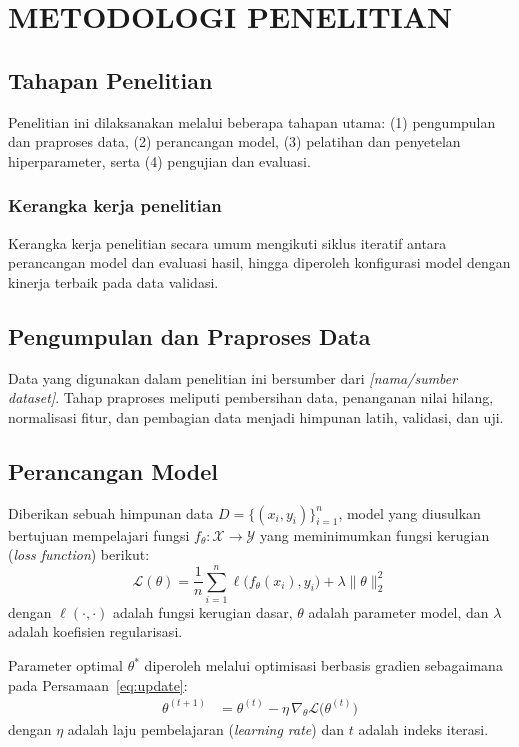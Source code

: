 \chapter{METODOLOGI PENELITIAN}

\section{Tahapan Penelitian}
Penelitian ini dilaksanakan melalui beberapa tahapan utama: (1) pengumpulan dan praproses data, (2) perancangan model, (3) pelatihan dan penyetelan hiperparameter, serta (4) pengujian dan evaluasi.

\subsection{Kerangka kerja penelitian}
Kerangka kerja penelitian secara umum mengikuti siklus iteratif antara perancangan model dan evaluasi hasil, hingga diperoleh konfigurasi model dengan kinerja terbaik pada data validasi.

\section{Pengumpulan dan Praproses Data}
Data yang digunakan dalam penelitian ini bersumber dari \textit{[nama/sumber dataset]}. Tahap praproses meliputi pembersihan data, penanganan nilai hilang, normalisasi fitur, dan pembagian data menjadi himpunan latih, validasi, dan uji.

\section{Perancangan Model}
Diberikan sebuah himpunan data $D = \{(x_i, y_i)\}_{i=1}^{n}$, model yang diusulkan bertujuan mempelajari fungsi $f_\theta: \mathcal{X} \rightarrow \mathcal{Y}$ yang meminimumkan fungsi kerugian (\textit{loss function}) berikut:
\begin{equation}
\label{eq:loss}
\mathcal{L}(\theta) = \frac{1}{n}\sum_{i=1}^{n} \ell\big(f_\theta(x_i), y_i\big) + \lambda \lVert \theta \rVert_2^2
\end{equation}
dengan $\ell(\cdot,\cdot)$ adalah fungsi kerugian dasar, $\theta$ adalah parameter model, dan $\lambda$ adalah koefisien regularisasi.

Parameter optimal $\theta^{*}$ diperoleh melalui optimisasi berbasis gradien sebagaimana pada Persamaan~\eqref{eq:update}:
\begin{align}
\label{eq:update}
\theta^{(t+1)} &= \theta^{(t)} - \eta \, \nabla_\theta \mathcal{L}\big(\theta^{(t)}\big)
\end{align}
dengan $\eta$ adalah laju pembelajaran (\textit{learning rate}) dan $t$ adalah indeks iterasi.

